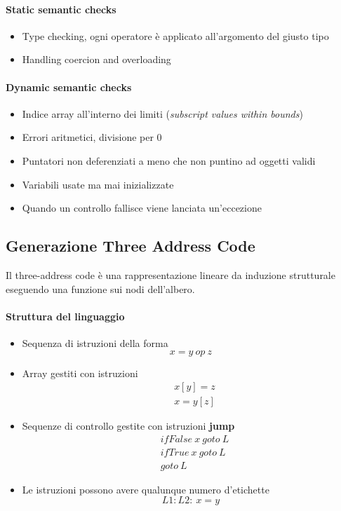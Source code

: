 \paragraph{Static semantic checks}
\begin{itemize}
\item Type checking, ogni operatore è applicato all'argomento del
giusto tipo
\item Handling coercion and overloading
\end{itemize}

\paragraph{Dynamic semantic checks}
\begin{itemize}
\item Indice array all'interno dei limiti
(\textit{subscript values within bounds})
\item Errori aritmetici, divisione per 0
\item Puntatori non deferenziati a meno che non puntino ad oggetti validi
\item Variabili usate ma mai inizializzate
\item Quando un controllo fallisce viene lanciata un'eccezione
\end{itemize}

\subsection{Generazione Three Address Code}
Il three-address code è una rappresentazione lineare da induzione strutturale
eseguendo una funzione sui nodi dell'albero.
\paragraph{Struttura del linguaggio}
\begin{itemize}
\item Sequenza di istruzioni della forma $$x = y \ op \ z$$
\item Array gestiti con istruzioni
\begin{align*}
& x[y] = z \\
& x = y[z]
\end{align*}
\item Sequenze di controllo gestite con istruzioni \textbf{jump}
\begin{align*}
& ifFalse \ x \ goto \ L \\
& ifTrue \ x \ goto \ L \\
& goto \ L
\end{align*}
\item Le istruzioni possono avere qualunque numero d'etichette
$$L1:L2: \ x = y$$
\end{itemize}

